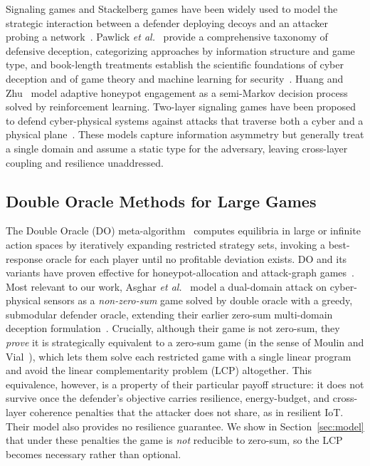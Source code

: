 \documentclass[conference]{IEEEtran}
\begin{document}
Signaling games and Stackelberg games have been widely used to model the
strategic interaction between a defender deploying decoys and an attacker
probing a network~\cite{tambe2011}. Pawlick \textit{et al.}~\cite{pawlick2019}
provide a comprehensive taxonomy of defensive deception, categorizing
approaches by information structure and game type, and book-length treatments
establish the scientific foundations of cyber deception and of game theory and
machine learning for security~\cite{jajodia2016,kamhoua2021}. Huang and
Zhu~\cite{huang2019} model adaptive honeypot engagement as a semi-Markov
decision process solved by reinforcement learning. Two-layer signaling games
have been proposed to defend cyber-physical systems against attacks that
traverse both a cyber and a physical plane~\cite{kamdem2024}. These models
capture information asymmetry but generally treat a single domain and assume a
static type for the adversary, leaving cross-layer coupling and resilience
unaddressed.

\subsection{Double Oracle Methods for Large Games}

The Double Oracle (DO) meta-algorithm~\cite{mcmahan2003} computes equilibria in
large or infinite action spaces by iteratively expanding restricted strategy
sets, invoking a best-response oracle for each player until no profitable
deviation exists. DO and its variants have proven effective for
honeypot-allocation and attack-graph
games~\cite{nguemkam2024,ngo2021,durkota2015}. Most relevant to our work, Asghar
\textit{et al.}~\cite{asghar2025} model a dual-domain attack on cyber-physical
sensors as a \emph{non-zero-sum} game solved by double oracle with a greedy,
submodular defender oracle, extending their earlier zero-sum multi-domain
deception formulation~\cite{asghar2024cns}. Crucially, although their game is
not zero-sum, they \emph{prove} it is strategically equivalent to a zero-sum
game (in the sense of Moulin and Vial~\cite{moulin1978}), which lets them solve each restricted
game with a single linear program and avoid the linear complementarity problem
(LCP) altogether. This equivalence, however, is a property of their particular
payoff structure: it does not survive once the defender's objective carries
resilience, energy-budget, and cross-layer coherence penalties that the attacker
does not share, as in resilient IoT. Their model also provides no resilience
guarantee. We show in Section~\ref{sec:model} that under these penalties the
game is \emph{not} reducible to zero-sum, so the LCP becomes necessary rather
than optional.
\end{document}
